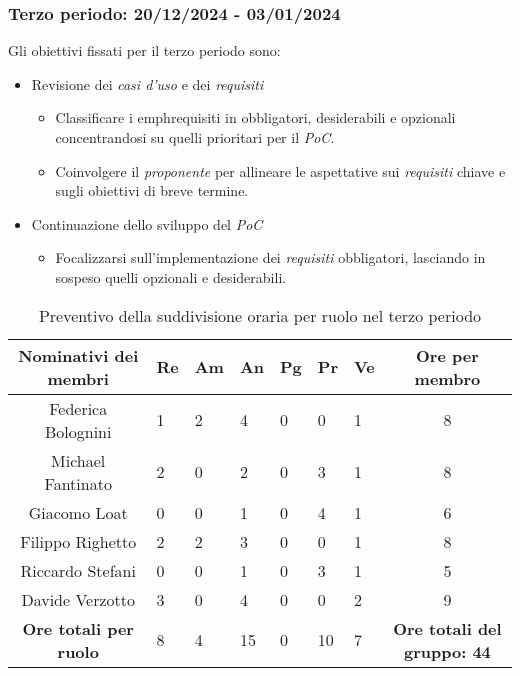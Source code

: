 \newpage
\subsubsection{Terzo periodo: 20/12/2024 - 03/01/2024}  
\label{sec:prev_cons_terzo_periodo}  

Gli obiettivi fissati per il terzo periodo sono:  
\begin{itemize}  
    \item Revisione dei \emph{casi d’uso} e dei \emph{requisiti} 
    \begin{itemize}  
        \item Classificare i emph{requisiti} in obbligatori, desiderabili e opzionali concentrandosi su quelli prioritari per il \emph{PoC}.  
        \item Coinvolgere il \emph{proponente} per allineare le aspettative sui \emph{requisiti} chiave e sugli obiettivi di breve termine.  
    \end{itemize}  
    \item Continuazione dello sviluppo del \emph{PoC}
    \begin{itemize}  
        \item Focalizzarsi sull’implementazione dei \emph{requisiti} obbligatori, lasciando in sospeso quelli opzionali e desiderabili.    
    \end{itemize}   
\end{itemize} 

\begin{table}[h!]
    \centering
    \renewcommand{\arraystretch}{1.5}
    \begin{tabularx}{\textwidth}{|c|X|X|X|X|X|X|c|}\hline
    \rowcolor[HTML]{FFD700} 
    \textbf{Nominativi dei membri} & \textbf{Re} & \textbf{Am} & \textbf{An} & \textbf{Pg} & \textbf{Pr} & \textbf{Ve} & \textbf{Ore per membro} \\ \hline
    Federica Bolognini  & 1 & 2 & 4 & 0 & 0 & 1 & 8 \\ \hline
    Michael Fantinato   & 2 & 0 & 2 & 0 & 3 & 1 & 8 \\ \hline
    Giacomo Loat        & 0 & 0 & 1 & 0 & 4 & 1 & 6 \\ \hline
    Filippo Righetto    & 2 & 2 & 3 & 0 & 0 & 1 & 8 \\ \hline
    Riccardo Stefani    & 0 & 0 & 1 & 0 & 3 & 1 & 5 \\ \hline
    Davide Verzotto     & 3 & 0 & 4 & 0 & 0 & 2 & 9 \\ \hline
    \rowcolor[HTML]{FFD700} 
    \textbf{Ore totali per ruolo} & 8 & 4 & 15 & 0 & 10 & 7 & \textbf{Ore totali del gruppo: 44} \\ \hline
    \end{tabularx}
    \caption{Preventivo della suddivisione oraria per ruolo nel terzo periodo}
\end{table}

